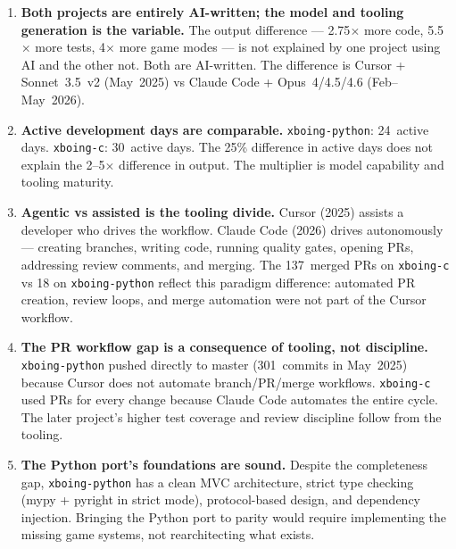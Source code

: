 \documentclass[a4paper,10pt]{article}
\newcommand{\repo}[1]{\texttt{#1}}
\begin{document}
\begin{enumerate}
  \item \textbf{Both projects are entirely AI-written; the model
    and tooling generation is the variable.}  The output difference
    --- 2.75$\times$ more code, 5.5$\times$ more tests, 4$\times$
    more game modes --- is not explained by one project using AI
    and the other not.  Both are AI-written.  The difference is
    Cursor + Sonnet~3.5~v2 (May~2025) vs Claude Code +
    Opus~4/4.5/4.6 (Feb--May~2026).

  \item \textbf{Active development days are comparable.}
    \repo{xboing-python}: 24~active days.  \repo{xboing-c}:
    30~active days.  The 25\% difference in active days does not
    explain the 2--5$\times$ difference in output.  The multiplier
    is model capability and tooling maturity.

  \item \textbf{Agentic vs assisted is the tooling divide.}
    Cursor (2025) assists a developer who drives the workflow.
    Claude Code (2026) drives autonomously --- creating branches,
    writing code, running quality gates, opening PRs, addressing
    review comments, and merging.  The 137~merged PRs on
    \repo{xboing-c} vs 18 on \repo{xboing-python} reflect this
    paradigm difference: automated PR creation, review loops, and
    merge automation were not part of the Cursor workflow.

  \item \textbf{The PR workflow gap is a consequence of tooling,
    not discipline.}  \repo{xboing-python} pushed directly to
    master (301~commits in May~2025) because Cursor does not
    automate branch/PR/merge workflows.  \repo{xboing-c} used PRs
    for every change because Claude Code automates the entire
    cycle.  The later project's higher test coverage and review
    discipline follow from the tooling.

  \item \textbf{The Python port's foundations are sound.}  Despite
    the completeness gap, \repo{xboing-python} has a clean MVC
    architecture, strict type checking (mypy + pyright in strict
    mode), protocol-based design, and dependency injection.
    Bringing the Python port to parity would require implementing
    the missing game systems, not rearchitecting what exists.
\end{enumerate}
\end{document}
